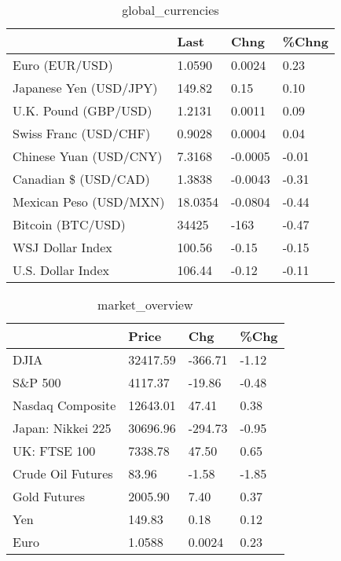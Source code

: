\documentclass{article}%
\begin{document}
%


\begin{table}[htbp]%
\caption{global\_currencies}%
\centering%
\begin{adjustbox}{width=1\textwidth}%
\begin{tabular}{llll}
\toprule
                       &    Last &    Chng & \%Chng \\
\midrule
        Euro (EUR/USD) &  1.0590 &  0.0024 &  0.23 \\
Japanese Yen (USD/JPY) &  149.82 &    0.15 &  0.10 \\
  U.K. Pound (GBP/USD) &  1.2131 &  0.0011 &  0.09 \\
 Swiss Franc (USD/CHF) &  0.9028 &  0.0004 &  0.04 \\
Chinese Yuan (USD/CNY) &  7.3168 & -0.0005 & -0.01 \\
  Canadian \$ (USD/CAD) &  1.3838 & -0.0043 & -0.31 \\
Mexican Peso (USD/MXN) & 18.0354 & -0.0804 & -0.44 \\
     Bitcoin (BTC/USD) &   34425 &    -163 & -0.47 \\
      WSJ Dollar Index &  100.56 &   -0.15 & -0.15 \\
     U.S. Dollar Index &  106.44 &   -0.12 & -0.11 \\
\bottomrule
\end{tabular}
%
\end{adjustbox}%
\end{table}

%


\begin{table}[htbp]%
\caption{market\_overview}%
\centering%
\begin{adjustbox}{width=1\textwidth}%
\begin{tabular}{llll}
\toprule
                  &    Price &     Chg &  \%Chg \\
\midrule
             DJIA & 32417.59 & -366.71 & -1.12 \\
          S\&P 500 &  4117.37 &  -19.86 & -0.48 \\
 Nasdaq Composite & 12643.01 &   47.41 &  0.38 \\
Japan: Nikkei 225 & 30696.96 & -294.73 & -0.95 \\
     UK: FTSE 100 &  7338.78 &   47.50 &  0.65 \\
Crude Oil Futures &    83.96 &   -1.58 & -1.85 \\
     Gold Futures &  2005.90 &    7.40 &  0.37 \\
              Yen &   149.83 &    0.18 &  0.12 \\
             Euro &   1.0588 &  0.0024 &  0.23 \\
\bottomrule
\end{tabular}
%
\end{adjustbox}%
\end{table}

%
\end{document}

